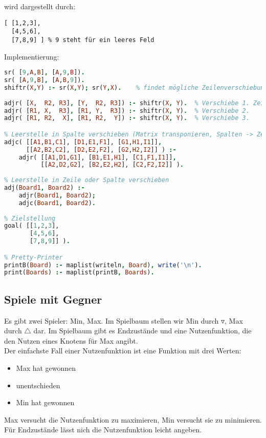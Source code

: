 wird dargestellt durch:
\begin{lstlisting}
[ [1,2,3], 
  [4,5,6], 
  [7,8,9] ]	% 9 steht für ein leeres Feld
\end{lstlisting}
Implementierung:
\begin{lstlisting}[language=Prolog]
% Leerstelle in Zeile verschieben
sr( [9,A,B], [A,9,B]).
sr( [A,9,B], [A,B,9]).
shiftr(X,Y) :- sr(X,Y); sr(Y,X).	% findet mögliche Zeilenverschiebungen.
 
adjr( [X,  R2, R3], [Y,  R2, R3]) :- shiftr(X, Y).	% Verschiebe 1. Zeile, wenn sie Leerstelle enthält.
adjr( [R1, X,  R3], [R1, Y,  R3]) :- shiftr(X, Y).	% Verschiebe 2.
adjr( [R1, R2,  X], [R1, R2,  Y]) :- shiftr(X, Y).	% Verschiebe 3.

% Leerstelle in Spalte verschieben (Matrix transponieren, Spalten -> Zeilen. Damit Zeilenverschiebung durchführen)
adjc( [[A1,B1,C1], [D1,E1,F1], [G1,H1,I1]], 
      [[A2,B2,C2], [D2,E2,F2], [G2,H2,I2]] ) :-
	adjr( [[A1,D1,G1], [B1,E1,H1], [C1,F1,I1]],
	      [[A2,D2,G2], [B2,E2,H2], [C2,F2,I2]] ).  
 
% Leerstelle in Zeile oder Spalte verschieben
adj(Board1, Board2) :-
	adjr(Board1, Board2);
	adjc(Board1, Board2).
	
% Zielstellung
goal( [[1,2,3],
       [4,5,6],
       [7,8,9]] ).

% Pretty-Printer
printB(Board) :- maplist(writeln, Board), write('\n').
print(Boards) :- maplist(printB, Boards).
\end{lstlisting}

\subsection{Spiele mit Gegner}
Es gibt zwei Spieler: Min, Max. Im Spielbaum stellen wir Min durch $\triangledown$, Max durch $\triangle$ dar. Im Spielbaum gibt es Endzustände und eine Nutzenfunktion, die den Nutzen eines Knotens für Max angibt.\\
Der einfachste Fall einer Nutzenfunktion ist eine Funktion mit drei Werten:
\begin{itemize}
\item[1:] Max hat gewonnen
\item[0:] unentschieden
\item[-1:] Min hat gewonnen
\end{itemize}
Max versucht die Nutzenfunktion zu maximieren, Min versucht sie zu minimieren.\\
Für Endzustände lässt nich die Nutzenfunktion leicht angeben.

